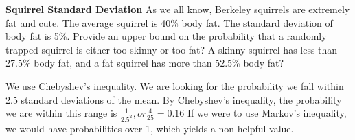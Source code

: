 \question \textbf{Squirrel Standard Deviation}\newline
As we all know, Berkeley squirrels are extremely fat and cute. 
The average squirrel is 40\% body fat. The standard deviation of body 
fat is 5\%. Provide an upper bound on the probability that a randomly 
trapped squirrel is either too skinny or too fat? A skinny squirrel 
has less than 27.5\% body fat, and a fat squirrel has more than 52.5\% 
body fat?
\begin{solution}[3cm]
We use Chebyshev's inequality. We are looking for the probability we 
fall within 2.5 standard deviations of the mean. By Chebyshev's 
inequality, the probability we are within this range is $\frac{1}{2.5^2}, or \frac{4}{25} = 0.16$
If we were to use Markov's inequality, we would have probabilities over 1, 
which yields a non-helpful value.
\end{solution}   
